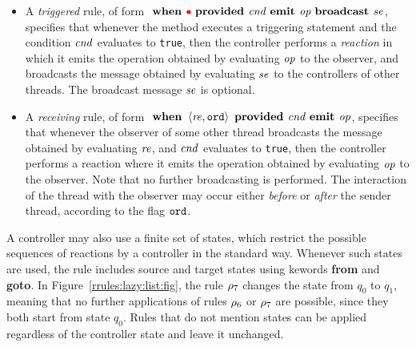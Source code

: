 
\begin{itemize}
\item
  A {\em triggered} rule, of form
\(
\mbox{ \bf when }\textcolor{red}{\bullet}\mbox{ \bf provided }{\it cnd}\mbox{ \bf emit }{\it op}\mbox{ \bf broadcast } {\it se}
\), 
specifies that whenever the method executes a triggering statement
and the condition ${\it cnd}$ evaluates to {\tt true}, then 
the controller performs a {\em reaction} in which it emits the operation
obtained by evaluating ${\it op}$
to the observer, and broadcasts the message obtained by evaluating ${\it se}$
to the controllers of other threads.
%
%
The broadcast message ${\it se}$ is optional.
\item
  A {\em receiving} rule, of form
\(
\mbox{ \bf when }\left\langle{\it re},{\tt ord}\right\rangle\mbox{ \bf provided }{\it cnd}\mbox{ \bf emit }{\it op}
\),
specifies that whenever the observer of some other thread broadcasts
the message obtained by evaluating ${\it re}$, 
and ${\it cnd}$ evaluates to {\tt true},
then the controller performs a
reaction where it emits the operation obtained by evaluating
${\it op}$ to the observer.
%
Note that no further broadcasting is
performed.
%
The interaction of the thread with the observer 
may occur either
{\it before} or {\it after}
the sender thread, according to the flag ${\tt ord}$.
\end{itemize}
A controller may also use a finite set of states,  which restrict the
possible sequences of reactions by a controller in the standard way.
Whenever such states are used, the rule includes source and target states
using kewords {\bf from} and {\bf goto}.
In Figure~\ref{rrules:lazy:list:fig}, the rule $\rho_7$
changes the state from $q_0$ to $q_1$, meaning that no further applications
of rules $\rho_6$ or $\rho_7$ are possible, since they both
start from state $q_0$. Rules that do not mention states can be
applied regardless of the controller state and leave it unchanged.

